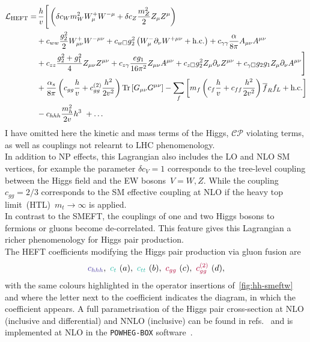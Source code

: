 \begin{align}\nonumber
	\mathcal{L}_{\mathrm{HEFT}} = & \, \frac{h}{v} \Bigg[  \left( \delta c_W m_W^2 W_{\mu}^+W^{-\mu} +\delta c_Z \frac{m_Z^2}{2} Z_\mu Z^\mu\right)  \\\nonumber
	&+c_{ww}\frac{g_2^2}{2}W_{\mu\nu}^+W^{-\mu\nu} + c_{w\square} g_2^2\left(W_{\mu}^-\partial_\nu W^{+\mu\nu} + \text{h.c.}\right) +  c_{\gamma\gamma}\frac{\alpha}{8 \pi}A_{\mu\nu}A^{\mu\nu} \\\nonumber
	& +c_{zz}\frac{g_2^2 + g_1^2}{4} Z_{\mu\nu}Z^{\mu\nu}+ c_{z\gamma}\frac{e g_1}{16 \pi^2}Z_{\mu\nu}A^{\mu\nu}
	+c_{z\square}g_2^2Z_\mu\partial_\nu Z^{\mu\nu}
	+c_{\gamma \square}g_2 g_1 Z_\mu\partial_\nu A^{\mu\nu}
	\Bigg]\\\nonumber
	&+ \frac{\alpha_s}{8 \pi} \left( c_{gg} \frac{h}{v} +  c_{gg}^{(2)} \frac{h^2}{2 v^2}\right) \mbox{Tr}\,[G_{\mu\nu} G^{\mu\nu}]
	-\sum_f \left[ m_f \left(c_f \frac{h}{v} + c _{ff} \frac{h^2}{2v^2}\right) \overline{f}_{R}f_{L}+\text{h.c.}\right]\\
	& - c_{hhh} \frac{m_h^2}{2 v} h^3\ + \dots\label{eq:coupl_def}
\end{align}
I have omitted here the kinetic and mass terms of the Higgs, $\mathcal{CP}$ violating terms, as well as couplings not relearnt to LHC phenomenology. \\
In addition to NP effects, this Lagrangian also includes the LO and NLO SM vertices, for example the parameter $\delta c_V=1$ corresponds to the tree-level coupling between the Higgs field and the EW bosons~$ V=W, Z$. While the coupling $c_{gg}= 2/3$ corresponds to the SM effective coupling at NLO if the heavy top limit~(HTL)~$m_t \to \infty$ is applied. \\
In contrast to the SMEFT, the couplings of one and two Higgs bosons to fermions or gluons become de-correlated. This feature gives this Lagrangian a richer phenomenology for Higgs pair production.  \\
The HEFT coefficients modifying the Higgs pair production via gluon fusion are 
\begin{equation}
	\textcolor[HTML]{4334a0}{c_{hhh} }, \ 	\textcolor[HTML]{2ebbaa}{c_t}\ (a) , \  	\textcolor[HTML]{2ebbaa}{c_{tt}} \ (b), \  \textcolor[HTML]{ae0034}{c_{gg}} \ (c), \  \textcolor[HTML]{ae0034}{c_{gg}^{(2)}} \ (d),
\end{equation}
with the same colours highlighted in the operator insertions of~\autoref{fig:hh-smeftw} and where the letter next to the coefficient indicates the diagram, in which the coefficient appears.  A full parametrisation of the Higgs pair cross-section at NLO (inclusive and differential) and NNLO (inclusive) can be found in refs.~\cite{Buchalla:2018yce,Capozi:2019xsi,deFlorian:2021azd} and is implemented at NLO in the \texttt{POWHEG-BOX} software~\cite{Heinrich:2020ckp}. \\

